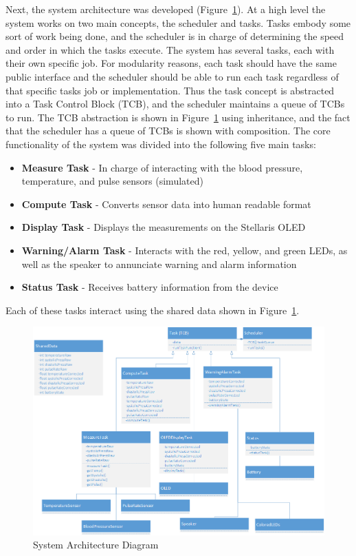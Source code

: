 \documentclass[12pt]{article} %
\begin{document}
Next, the system architecture was developed (Figure~\ref{fig:arch}).  At a high
level the system works on two main concepts, the scheduler and tasks.  Tasks
embody some sort of work being done, and the scheduler is in charge of
determining the speed and order in which the tasks execute.  The system has
several tasks, each with their own specific job.  For modularity reasons, each
task should have the same public interface and the scheduler should be able to
run each task regardless of that specific tasks job or implementation.  Thus
the task concept is abstracted into a Task Control Block (TCB), and the
scheduler maintains a queue of TCBs to run.  The TCB abstraction is shown in
Figure~\ref{fig:arch} using inheritance, and the fact that the scheduler has a
queue of TCBs is shown with composition.  The core functionality of the system
was divided into the following five main tasks:
\begin{itemize}
  \item \textbf{Measure Task} - In charge of interacting with the blood pressure, temperature, and pulse sensors (simulated)
  \item \textbf{Compute Task} - Converts sensor data into human readable format
  \item \textbf{Display Task} - Displays the measurements on the Stellaris OLED
  \item \textbf{Warning/Alarm Task} - Interacts with the red, yellow, and green LEDs, as well as the speaker to annunciate warning and alarm information
  \item \textbf{Status Task} - Receives battery information from the device
\end{itemize}
Each of these tasks interact using the shared data shown in Figure~\ref{fig:arch}. 

\begin{figure}
    \centering
    \includegraphics[width=\textwidth]{../design/System_Architecture}
    \caption{System Architecture Diagram}
    \label{fig:arch}
\end{figure}
\end{document}
